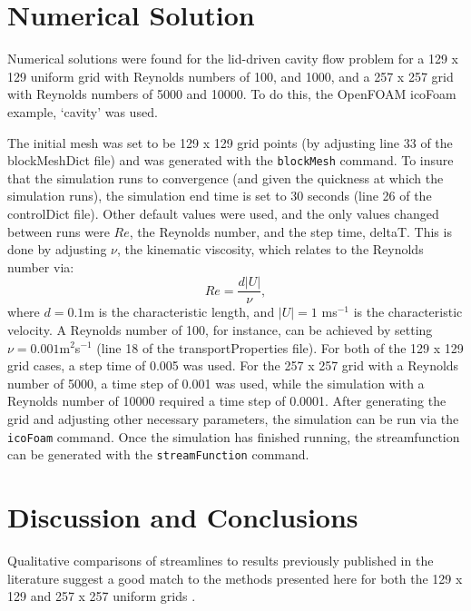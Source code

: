 \documentclass[twocolumn,10pt]{asme2ej}
\begin{document}
\section{Numerical Solution}
Numerical solutions were found for the lid-driven cavity flow problem for a 129 x 129 uniform grid with Reynolds numbers of 100, and 1000, and a 257 x 257 grid with Reynolds numbers of 5000 and 10000. To do this, the OpenFOAM icoFoam example, `cavity' was used.

The initial mesh was set to be 129 x 129 grid points (by adjusting line 33 of the blockMeshDict file) and was generated with the \lstinline[language=sh]`blockMesh` command. To insure that the simulation runs to convergence (and given the quickness at which the simulation runs), the simulation end time is set to 30 seconds (line 26 of the controlDict file). Other default values were used, and the only values changed between runs were $Re$, the Reynolds number, and the step time, deltaT. This is done by adjusting $\nu$, the kinematic viscosity, which relates to the Reynolds number via:
\begin{equation}
Re = \frac{d|U|}{\nu},
\end{equation}
where $d = 0.1$m is the characteristic length, and $|U| = 1$ ms$^{-1}$ is the characteristic velocity. A Reynolds number of 100, for instance, can be achieved by setting $\nu = 0.001$m$^2$s$^{-1}$ (line 18 of the transportProperties file). For both of the 129 x 129 grid cases, a step time of 0.005 was used. For the 257 x 257 grid with a Reynolds number of 5000, a time step of 0.001 was used, while the simulation with a Reynolds number of 10000 required a time step of 0.0001. After generating the grid and adjusting other necessary parameters, the simulation can be run via the \lstinline[language=sh]`icoFoam` command. Once the simulation has finished running, the streamfunction can be generated with the \lstinline[language=sh]`streamFunction` command.

\section{Discussion and Conclusions}
Qualitative comparisons of streamlines to results previously published in the literature suggest a good match to the methods presented here for both the 129 x 129 and 257 x 257 uniform grids \cite{ghia1982high}.
\end{document}
